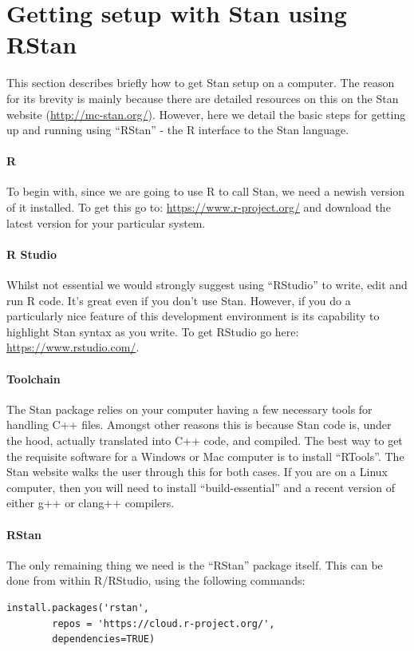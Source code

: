 \documentclass[11pt,fullpage]{book}
\begin{document}
\section{Getting setup with Stan using RStan}\label{sec:StanJags_installation}
This section describes briefly how to get Stan setup on a computer. The reason for its brevity is mainly because there are detailed resources on this on the Stan website (\url{http://mc-stan.org/}). However, here we detail the basic steps for getting up and running using ``RStan'' - the R interface to the Stan language. 

\paragraph{R}
To begin with, since we are going to use R to call Stan, we need a newish version of it installed. To get this go to: \url{https://www.r-project.org/} and download the latest version for your particular system. 

\paragraph{R Studio}
Whilst not essential we would strongly suggest using ``RStudio'' to write, edit and run R code. It's great even if you don't use Stan. However, if you do a particularly nice feature of this development environment is its capability to highlight Stan syntax as you write. To get RStudio go here: \url{https://www.rstudio.com/}.

\paragraph{Toolchain}
The Stan package relies on your computer having a few necessary tools for handling C++ files. Amongst other reasons this is because Stan code is, under the hood, actually translated into C++ code, and compiled. The best way to get the requisite software for a Windows or Mac computer is to install ``RTools''. The Stan website walks the user through this for both cases. If you are on a Linux computer, then you will need to install ``build-essential'' and a recent version of either g++ or clang++ compilers.

\paragraph{RStan}
The only remaining thing we need is the ``RStan'' package itself. This can be done from within R/RStudio, using the following commands:
\begin{verbatim}
install.packages('rstan', 
		repos = 'https://cloud.r-project.org/',
		dependencies=TRUE)
\end{verbatim}
\end{document}
